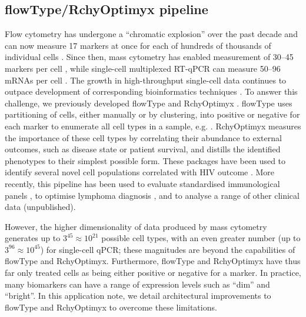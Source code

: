 \subsection{flowType/RchyOptimyx pipeline}
\label{sec:fcs:flowtype-rchy}
 Flow cytometry has undergone a ``chromatic explosion'' over the past decade and can now measure 17 markers at once for each of hundreds of thousands of individual cells \cite{Chattopadhyay2008}.
Since then, mass cytometry has enabled measurement of 30--45 markers per cell \cite{Bendall2012a}, while single-cell multiplexed RT-qPCR can measure 50--96 mRNAs per cell \cite{White2011}. 
The growth in high-throughput single-cell data continues to outpace development of corresponding bioinformatics techniques \cite{Chattopadhyay2008}.
To answer this challenge, we previously developed flowType \cite{Aghaeepour2012} and RchyOptimyx \cite{Aghaeepour2012a}. 
flowType uses partitioning of cells, either manually or by clustering, into positive or negative for each marker to enumerate all cell types in a sample, e.g. \cite{Aghaeepour2013Critical}.
RchyOptimyx measures the importance of these cell types by correlating their abundance to external outcomes, such as disease state or patient survival, and distills the identified phenotypes to their simplest possible form. 
These packages have been used to identify several novel cell populations correlated with HIV outcome \cite{Aghaeepour2012}. 
More recently, this pipeline has been used to evaluate standardised immunological panels \cite{Villanovaa2013Computational}, to optimise lymphoma diagnosis \cite{Craig2013Computational}, and to analyse a range of other clinical data (unpublished).

However, the higher dimensionality of data produced by mass cytometry generates up to $3^{45}\approx10^{21}$ possible cell types, with an even greater number (up to $3^{96}\approx10^{45}$) for single-cell qPCR; these magnitudes are beyond the capabilities of flowType and RchyOptimyx.
Furthermore, flowType and RchyOptimyx have thus far only treated cells as being either positive or negative for a marker.
In practice, many biomarkers can have a range of expression levels such as ``dim'' and ``bright''. 
In this application note, we detail architectural improvements to flowType and RchyOptimyx to overcome these limitations.  

